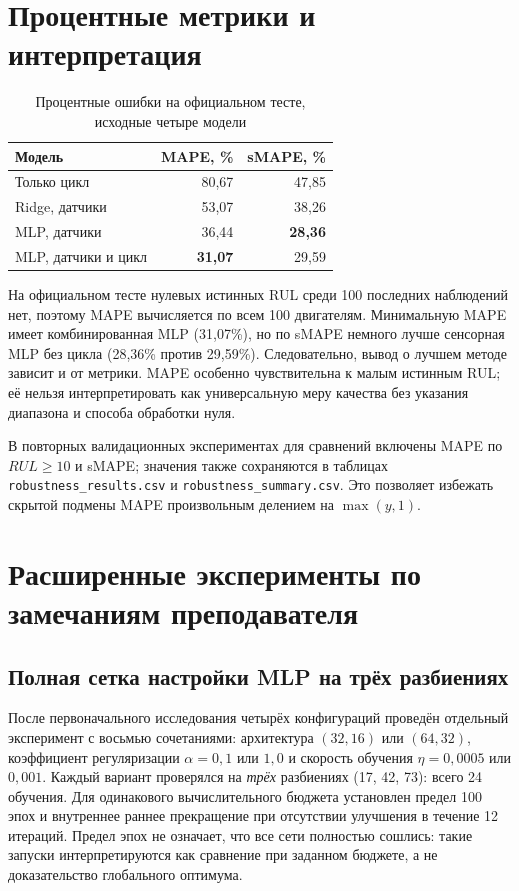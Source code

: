 \documentclass[12pt,a4paper]{article}
\begin{document}
\section{Процентные метрики и интерпретация}
\begin{table}[H]\centering\caption{Процентные ошибки на официальном тесте, исходные четыре модели}\begin{tabular}{lrr}\toprule Модель & MAPE, \% & sMAPE, \%\\\midrule Только цикл & 80,67 & 47,85\\ Ridge, датчики & 53,07 & 38,26\\ MLP, датчики & 36,44 & \textbf{28,36}\\ MLP, датчики и цикл & \textbf{31,07} & 29,59\\\bottomrule\end{tabular}\end{table}
На официальном тесте нулевых истинных RUL среди 100 последних наблюдений нет, поэтому MAPE вычисляется по всем 100 двигателям. Минимальную MAPE имеет комбинированная MLP (31,07\%), но по sMAPE немного лучше сенсорная MLP без цикла (28,36\% против 29,59\%). Следовательно, вывод о лучшем методе зависит и от метрики. MAPE особенно чувствительна к малым истинным RUL; её нельзя интерпретировать как универсальную меру качества без указания диапазона и способа обработки нуля.

В повторных валидационных экспериментах для сравнений включены MAPE по $RUL\geq10$ и sMAPE; значения также сохраняются в таблицах \texttt{robustness\_results.csv} и \texttt{robustness\_summary.csv}. Это позволяет избежать скрытой подмены MAPE произвольным делением на $\max(y,1)$.

\section{Расширенные эксперименты по замечаниям преподавателя}
\subsection{Полная сетка настройки MLP на трёх разбиениях}
После первоначального исследования четырёх конфигураций проведён отдельный эксперимент с восьмью сочетаниями: архитектура $(32,16)$ или $(64,32)$, коэффициент регуляризации $\alpha=0{,}1$ или $1{,}0$ и скорость обучения $\eta=0{,}0005$ или $0{,}001$. Каждый вариант проверялся на \emph{трёх} разбиениях (17, 42, 73): всего 24 обучения. Для одинакового вычислительного бюджета установлен предел 100 эпох и внутреннее раннее прекращение при отсутствии улучшения в течение 12 итераций. Предел эпох не означает, что все сети полностью сошлись: такие запуски интерпретируются как сравнение при заданном бюджете, а не доказательство глобального оптимума.
\end{document}
